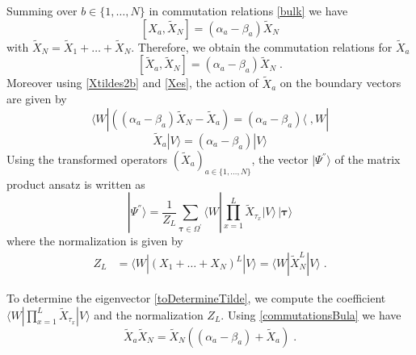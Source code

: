 \documentclass[10pt]{article}
\numberwithin{equation}{section}
\numberwithin{equation}{subsection}
\newcommand{\Xt}{\widetilde{X}}
\newcommand{\co}{\;,}
\newcommand{\dt}{\;.}
\begin{document}
Summing over $b\in \{1,\ldots,N\}$ in commutation relations \eqref{bulk} we have
\begin{equation} 
	\left[X_{a},\Xt_{N}\right]=(\alpha_{a}-\beta_{a})\Xt_{N}%
\end{equation}
with $\widetilde{X}_{N}=\widetilde{X}_{1}+\ldots+\widetilde{X}_{N}$. 
Therefore, we obtain the commutation relations for $\Xt_{a}$ 
\begin{equation}\label{commutationsBula}
	\left[\Xt_{a},\Xt_{N}\right]=(\alpha_{a}-\beta_{a})\Xt_{N}\dt %
\end{equation}
Moreover using \eqref{Xtildes2b} and \eqref{Xes}, the action of $\Xt_{a}$ on the boundary vectors are given by 
\begin{equation}\label{commLEFT}
	\langle W|\left((\alpha_{a}-\beta_{a})\Xt_{N}-\Xt_{a}\right)=(\alpha_{a}-\beta_{a})\langle\co W|%
\end{equation}
\begin{equation}\label{commRIGHT}
	\Xt_{a} |V\rangle= (\alpha_{a}-\beta_{a})|V\rangle%
\end{equation} 
Using the transformed operators $(\widetilde{X}_{a})_{a\in\{1,\ldots,N\}}$, the vector $|\Psi^{''}\rangle$ of the matrix product ansatz is written as
\begin{equation}\label{toDetermineTilde}
	|\Psi^{''}\rangle = \frac{1}{Z_{L}}\sum_{\bm{\tau}\in \Omega^{'}}\langle W|\prod_{x=1}^{L}\widetilde{X}_{\tau_{x}}
	|V \rangle \,|\bm{\tau}\rangle
\end{equation}
where the normalization is given by 
\begin{align}
		Z_{L}&=\langle W|(X_{1}+\ldots+X_{N})^{L}|V\rangle=\langle W|\widetilde{X}_{N}^{L}|V\rangle\dt
\end{align}
\begin{comment}
The basis is 
$$
|\bm{n}\rangle =|n_{1}^{1},\ldots,n_{N}^{1}\rangle \otimes \ldots\otimes |n_{1}^{L},\ldots,n_{N}^{L}\rangle
$$
such that, for each site $x\in \{1,\ldots,L\}$, $|n^{x}\rangle=|n_{1}^{x},\ldots,n_{N}^{x}\rangle\in \Omega_{x}^{'}$. \\
\end{comment}
To determine the eigenvector \eqref{toDetermineTilde}, we compute the coefficient $\langle W|\prod_{x=1}^{L}\widetilde{X}_{\tau_{x}}
|V \rangle$ and the normalization $Z_{L}$. Using \eqref{commutationsBula} we have
\begin{equation}\label{UsefulRelation}
	\widetilde{X}_{a}\widetilde{X}_{N}=\widetilde{X}_{N}\left((\alpha_{a}-\beta_{a})+\widetilde{X}_{a}\right)\dt
\end{equation}
\end{document}
